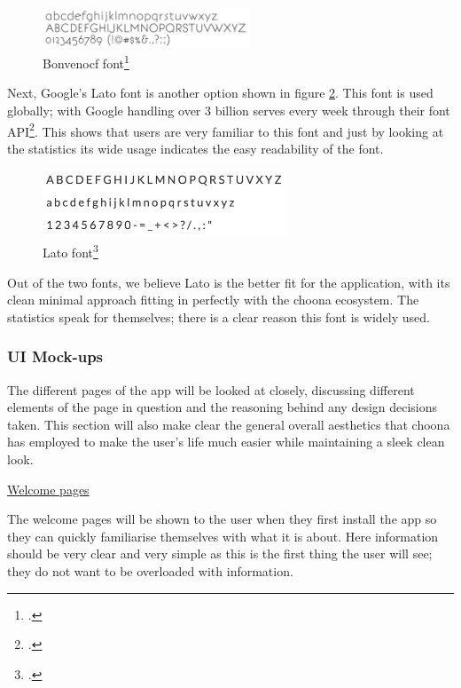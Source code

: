 \begin{figure}[h!]
\centering
\includegraphics[width=0.55\textwidth]{./img/bonvenocf.png}
\caption{Bonvenocf font\footcite{bonvenocf}}
\label{fig:Bonvenocf}
\end{figure}

Next, Google's Lato font is another option shown in figure \ref{fig:lato}. This font is used globally; with Google handling over 3 billion serves every week through their font API\footcite{googlelato}. This shows that users are very familiar to this font and just by looking at the statistics its wide usage indicates the easy readability of the font.

\begin{figure}[h!]
\centering
\includegraphics[width=0.65\textwidth]{./img/lato.png}
\caption{Lato font\footcite{googlelato}}
\label{fig:lato}
\end{figure}

Out of the two fonts, we believe Lato is the better fit for the application, with its clean minimal approach fitting in perfectly with the choona ecosystem.  The statistics speak for themselves; there is a clear reason this font is widely used.\\

\subsubsection*{UI Mock-ups}

The different pages of the app will be looked at closely, discussing different elements of the page in question and the reasoning behind any design decisions taken. This section will also make clear the general overall aesthetics that choona has employed to make the user's life much easier while maintaining a sleek clean look.\\

\clearpage

\noindent\underline{Welcome pages}\newline

The welcome pages will be shown to the user when they first install the app so they can quickly familiarise themselves with what it is about. Here information should be very clear and very simple as this is the first thing the user will see; they do not want to be overloaded with information. \\

